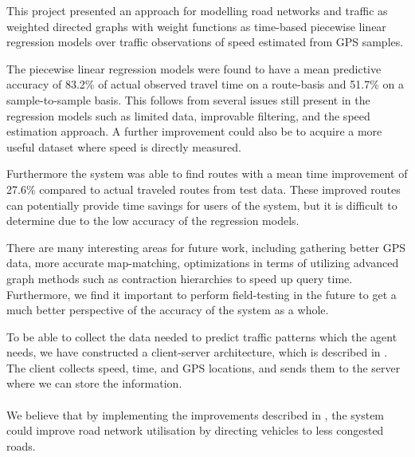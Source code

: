 This project presented an approach for modelling road networks and traffic as weighted directed graphs with weight functions as time-based piecewise linear regression models over traffic observations of speed estimated from GPS samples.

The piecewise linear regression models were found to have a mean predictive accuracy of 83.2\% of actual observed travel time on a route-basis and 51.7\% on a sample-to-sample basis. This follows from several issues still present in the regression models such as limited data, improvable filtering, and the speed estimation approach. A further improvement could also be to acquire a more useful dataset where speed is directly measured.

Furthermore the system was able to find routes with a mean time improvement of 27.6\% compared to actual traveled routes from test data. These improved routes can potentially provide time savings for users of the system, but it is difficult to determine due to the low accuracy of the regression models. 

There are many interesting areas for future work, including gathering better GPS data, more accurate map-matching, optimizations in terms of utilizing advanced graph methods such as contraction hierarchies to speed up query time. Furthermore, we find it important to perform field-testing in the future to get a much better perspective of the accuracy of the system as a whole.

To be able to collect the data needed to predict traffic patterns which the agent needs, we have constructed a client-server architecture, which is described in . The client collects speed, time, and GPS locations, and sends them to the server where we can store the information.
\\\\
We believe that by implementing the improvements described in , the system could improve road network utilisation by directing vehicles to less congested roads. 